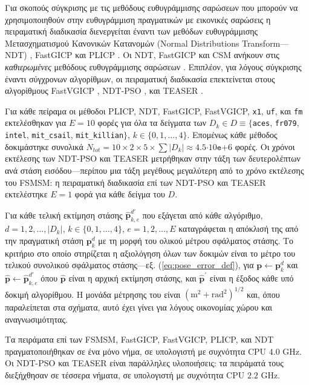 Για σκοπούς σύγκρισης με τις μεθόδους ευθυγράμμισης σαρώσεων που μπορούν να
χρησιμοποιηθούν στην ευθυγράμμιση πραγματικών με εικονικές σαρώσεις η
πειραματική διαδικασία διενεργείται έναντι των μεθόδων ευθυγράμμισης
Μετασχηματισμού Κανονικών Κατανομών (Normal Distributions Transform---NDT)
\cite{Bibera,ndt_code}, FastGICP \cite{Segal2009a,fgicp_code} και PLICP
\cite{Censi2008a,plicp_code}. Οι NDT, FastGICP και CSM ανήκουν στις
\textit{καθιερωμένες} μεθόδους ευθυγράμμισης σαρώσεων
\cite{Koide2021a,Xu2018b,Sobreira2019b,Pishehvari2019b,Qingshan2019c,Pham2021b}.
Επιπλέον, για λόγους σύγκρισης έναντι σύγχρονων αλγορίθμων, οι πειραματική
διαδικασία επεκτείνεται στους αλγορίθμους FastVGICP
\cite{Koide2021a,fgicp_code}, NDT-PSO \cite{Bouraine2021,ndt_pso_code}, και
TEASER \cite{Yang2021,teaser_code}.

Για κάθε πείραμα οι μέθοδοι PLICP, NDT, FastGICP, FastVGICP, \texttt{x1},
\texttt{uf}, και \texttt{fm} εκτελέσθηκαν για $E = 10$ φορές για όλα τα
δείγματα των $D_k \in D \equiv \{$\texttt{aces}, \texttt{fr079}, \texttt{intel},
\texttt{mit\_csail}, \texttt{mit\_killian}$\}$, $k \in \{0,1,\dots,4\}$.
Επομένως κάθε μέθοδος δοκιμάστηκε συνολικά $N_{tot} = 10 \times 2 \times 5
\times \sum |D_k|\approx 4.5$$\cdot10$$\texttt{e}$$+$$6$ φορές. Οι χρόνοι
εκτέλεσης των NDT-PSO και TEASER μετρήθηκαν στην τάξη των δευτερολέπτων ανά
στάση εισόδου---περίπου μια τάξη μεγέθους μεγαλύτερη από το χρόνο εκτέλεσης του
FSMSM: η πειραματική διαδικασία επί των NDT-PSO και TEASER εκτελέστηκε $E=1$
φορά για κάθε δείγμα του $D$.

Για κάθε τελική εκτίμηση στάσης $\hat{\bm{p}}_{k,e}^{d\prime}$ που εξάγεται από
κάθε αλγόριθμο, $d = 1,2,\dots,|D_k|$, $k \in \{0,1,\dots,4\}$, $e=1,2,\dots,E$
καταγράφεται η απόκλισή της από την πραγματική στάση $\bm{p}_k^d$ με τη μορφή
του ολικού μέτρου σφάλματος στάσης. Το κριτήριο στο οποίο στηρίζεται η
αξιολόγηση όλων των δοκιμών είναι το μέτρο του τελικού συνολικού σφάλματος
στάσης---εξ. (\ref{eq:pose_error_def}), για $\bm{p} \leftarrow \bm{p}^d_k$ και
$\hat{\bm{p}} \leftarrow \hat{\bm{p}}^{d\prime}_{k,e}$ όπου $\hat{\bm{p}}$
είναι η αρχική εκτίμηση στάσης, και $\hat{\bm{p}}^\prime$ είναι η έξοδος κάθε
υπό δοκιμή αλγορίθμου. Η μονάδα μέτρησης του είναι
$(\text{m}^2+\text{rad}^2)^{1/2}$ και, όπου παραλείπεται στα σχήματα, αυτό έχει
γίνει για λόγους οικονομίας χώρου και αναγνωσιμότητας.

Τα πειράματα επί των FSMSM, FastGICP, FastVGICP, PLICP, και NDT
πραγματοποιήθηκαν σε ένα μόνο νήμα, σε υπολογιστή με συχνότητα CPU $4.0$ GHz.
Οι NDT-PSO και TEASER είναι παράλληλες υλοποιήσεις: τα πειράματά τους
διεξήχθησαν σε τέσσερα νήματα, σε υπολογιστή με συχνότητα CPU $2.2$ GHz.



